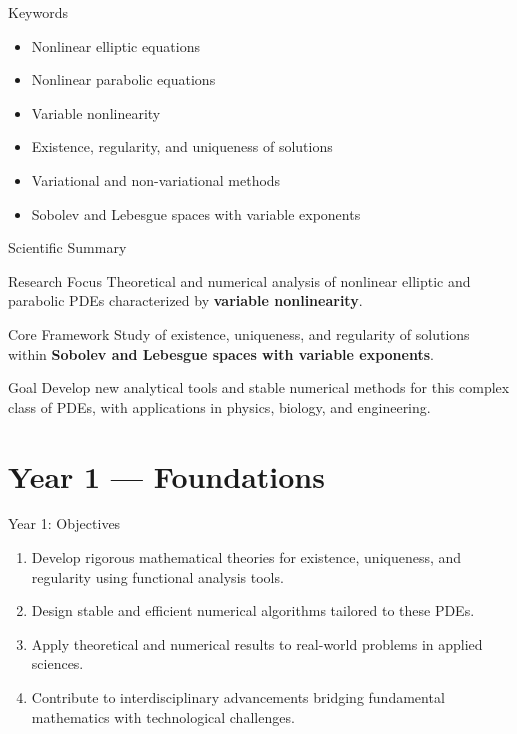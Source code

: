 \documentclass[11pt]{beamer}
\begin{document}
	\begin{frame}{Keywords}
		\begin{itemize}
			\item Nonlinear elliptic equations
			\item Nonlinear parabolic equations
			\item Variable nonlinearity
			\item Existence, regularity, and uniqueness of solutions
			\item Variational and non-variational methods
			\item Sobolev and Lebesgue spaces with variable exponents
		\end{itemize}
	\end{frame}
	
	\begin{frame}{Scientific Summary}
		\begin{block}{Research Focus}
			Theoretical and numerical analysis of nonlinear elliptic and parabolic PDEs characterized by \textbf{variable nonlinearity}.
		\end{block}
		
		\begin{block}{Core Framework}
			Study of existence, uniqueness, and regularity of solutions within \textbf{Sobolev and Lebesgue spaces with variable exponents}.
		\end{block}
		
		\begin{block}{Goal}
			Develop new analytical tools and stable numerical methods for this complex class of PDEs, with applications in physics, biology, and engineering.
		\end{block}
	\end{frame}
	
	\section{Year 1 — Foundations}
	
	\begin{frame}{Year 1: Objectives}
		\begin{enumerate}
			\item Develop rigorous mathematical theories for existence, uniqueness, and regularity using functional analysis tools.
			\item Design stable and efficient numerical algorithms tailored to these PDEs.
			\item Apply theoretical and numerical results to real-world problems in applied sciences.
			\item Contribute to interdisciplinary advancements bridging fundamental mathematics with technological challenges.
		\end{enumerate}
	\end{frame}
	
\end{document}
